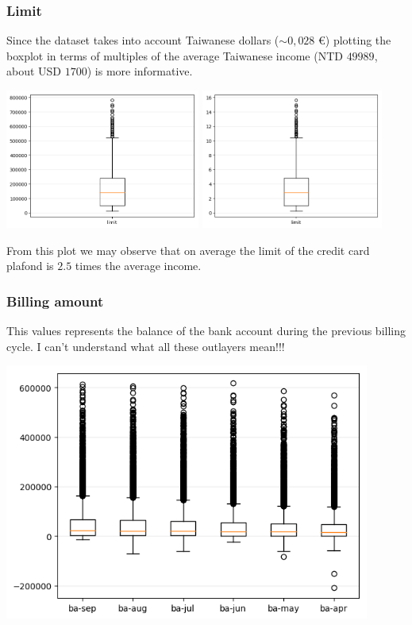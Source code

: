 \documentclass[a4paper]{article}
\begin{document}
\subsubsection{Limit}
Since the dataset takes into account Taiwanese dollars ($\sim 0,028$ €) plotting the boxplot in terms of multiples of the average Taiwanese income (NTD $49989$, about USD $1700$) is more informative.
\begin{center}
\includegraphics[width=0.48\textwidth]{../Code/boxPlotsGemma/boxplots/limit.png}
\includegraphics[width=0.45\textwidth]{../Code/boxPlotsGemma/boxplots/limitS.png}
\end{center}
From this plot we may observe that on average the limit of the credit card plafond is $2.5$ times the average income.
\subsubsection{Billing amount}
This values represents the balance of the bank account during the previous billing cycle.
I can't understand what all these outlayers mean!!!
\begin{center}
\includegraphics[width=0.9\textwidth]{../Code/boxPlotsGemma/boxplots/ba.png}
\end{center}
\end{document}

